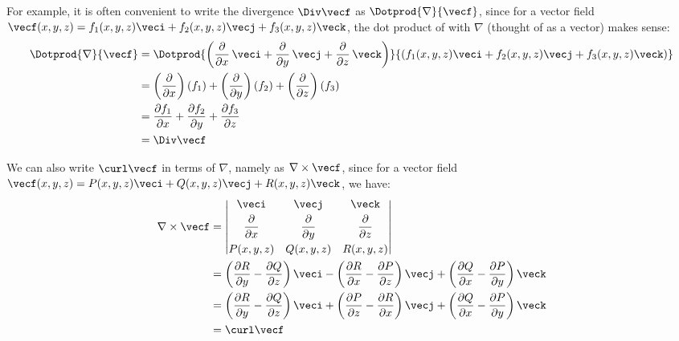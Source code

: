 For example, it is often convenient to write the divergence $\Div\vecf$ as $\Dotprod{\nabla}{\vecf}$, since for a vector field $\vecf(x,y,z) = f_1(x,y,z)\veci + f_2(x,y,z) \vecj + f_3(x,y,z) \veck$, the dot product of \vecf with $\nabla$ (thought of as a vector) makes sense:
\begin{align*}
 \Dotprod{\nabla}{\vecf} &= \Dotprod{ \left( \frac{\partial}{\partial x}\,\veci +
  \frac{\partial}{\partial y}\,\vecj + \frac{\partial}{\partial z}\,\veck \right) }{\left( f_1(x,y,z)
  \veci + f_2(x,y,z) \vecj + f_3(x,y,z) \veck \right) }\\
   &= \left( \frac{\partial}{\partial x} \right) (f_1) +
    \left( \frac{\partial}{\partial y} \right) (f_2) +
    \left( \frac{\partial}{\partial z} \right) (f_3)\\
   &= \frac{\partial f_1}{\partial x} + \frac{\partial f_2}{\partial y} +
  \frac{\partial f_3}{\partial z}\\
   &= \Div\vecf
\end{align*}

We can also write $\curl\vecf$ in terms of $\nabla$, namely as $\nabla\times\vecf$, since for a vector field $\vecf(x,y,z) = P(x,y,z)\veci + Q(x,y,z)\vecj + R(x,y,z)\veck$, we have:
\begin{align*}
 \nabla\times\vecf &=
 \begin{vmatrix}
  \veci & \vecj & \veck \vspace{1mm}\\ \dfrac{\partial}{\partial x} & \dfrac{\partial}{\partial y} &
   \dfrac{\partial}{\partial z} \vspace{1mm}\\
  P(x,y,z) & Q(x,y,z) & R(x,y,z)
 \end{vmatrix}\\
 &= \left( \frac{\partial R}{\partial y} - \frac{\partial Q}{\partial z} \right) \veci -
    \left( \frac{\partial R}{\partial x} - \frac{\partial P}{\partial z} \right) \vecj +
    \left( \frac{\partial Q}{\partial x} - \frac{\partial P}{\partial y} \right) \veck\\
 &= \left( \frac{\partial R}{\partial y} - \frac{\partial Q}{\partial z} \right) \veci +
    \left( \frac{\partial P}{\partial z} - \frac{\partial R}{\partial x} \right) \vecj +
    \left( \frac{\partial Q}{\partial x} - \frac{\partial P}{\partial y} \right) \veck\\
 &= \curl\vecf
\end{align*}

